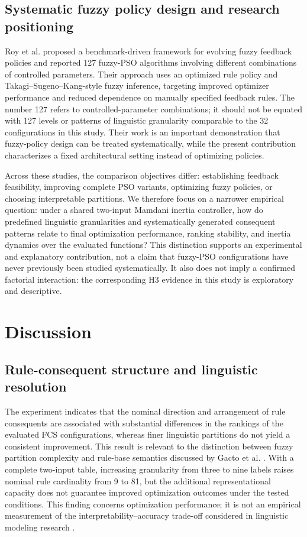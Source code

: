 \subsection{Systematic fuzzy policy design and research positioning}
Roy et al. \cite{Roy2024} proposed a benchmark-driven framework for evolving fuzzy feedback policies and reported 127 fuzzy-PSO algorithms involving different combinations of controlled parameters. Their approach uses an optimized rule policy and Takagi--Sugeno--Kang-style fuzzy inference, targeting improved optimizer performance and reduced dependence on manually specified feedback rules. The number 127 refers to controlled-parameter combinations; it should not be equated with 127 levels or patterns of linguistic granularity comparable to the 32 configurations in this study. Their work is an important demonstration that fuzzy-policy design can be treated systematically, while the present contribution characterizes a fixed architectural setting instead of optimizing policies.

Across these studies, the comparison objectives differ: establishing feedback feasibility, improving complete PSO variants, optimizing fuzzy policies, or choosing interpretable partitions. We therefore focus on a narrower empirical question: under a shared two-input Mamdani inertia controller, how do predefined linguistic granularities and systematically generated consequent patterns relate to final optimization performance, ranking stability, and inertia dynamics over the evaluated functions? This distinction supports an experimental and explanatory contribution, not a claim that fuzzy-PSO configurations have never previously been studied systematically. It also does not imply a confirmed factorial interaction: the corresponding H3 evidence in this study is exploratory and descriptive.

\section{Discussion}
\subsection{Rule-consequent structure and linguistic resolution}
The experiment indicates that the nominal direction and arrangement of rule consequents are associated with substantial differences in the rankings of the evaluated FCS configurations, whereas finer linguistic partitions do not yield a consistent improvement. This result is relevant to the distinction between fuzzy partition complexity and rule-base semantics discussed by Gacto et al. \cite{Gacto2011}. With a complete two-input table, increasing granularity from three to nine labels raises nominal rule cardinality from 9 to 81, but the additional representational capacity does not guarantee improved optimization outcomes under the tested conditions. This finding concerns optimization performance; it is not an empirical measurement of the interpretability--accuracy trade-off considered in linguistic modeling research \cite{Gacto2011,Castiello2019}.

